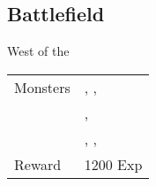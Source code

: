\subsection{Battlefield}
\label{map:battlefield_17}

West of the 

\noindent\begin{tabularx}{\textwidth}[l]{lX}
	Monsters
	& \nameref{monster:red_bone}, \nameref{monster:red_bone}, \nameref{monster:zombie} \\
	& \nameref{monster:ghost}, \nameref{monster:ghost} \\
	& \nameref{monster:ghost}, \nameref{monster:ghost}, \nameref{monster:red_bone}
\\ \hline
	Reward & 1200 Exp
\end{tabularx}
